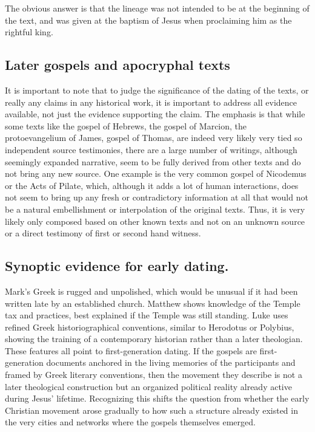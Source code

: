 The obvious answer is that the lineage was not intended to be at the beginning of the text, and was given at the baptism of Jesus when proclaiming him as the rightful king.

\subsection{Later gospels and apocryphal texts}\label{subsec:later-gospels-and-apocryphal-texts}

It is important to note that to judge the significance of the dating of the texts, or really any claims in any historical work, it is important to address all evidence available, not just the evidence supporting the claim.
The emphasis is that while some texts like the gospel of Hebrews, the gospel of Marcion, the protoevangelium of James, gospel of Thomas, are indeed very likely very tied so independent source testimonies, there are a large number of writings, although seemingly expanded narrative, seem to be fully derived from other texts and do not bring any new source.
One example is the very common gospel of Nicodemus or the Acts of Pilate, which, although it adds a lot of human interactions, does not seem to bring up any fresh or contradictory information at all that would not be a natural embellishment or interpolation of the original texts.
Thus, it is very likely only composed based on other known texts and not on an unknown source or a direct testimony of first or second hand witness.

\subsection{Synoptic evidence for early dating.}\label{subsec:synoptic-evidence-for-early-dating.}

Mark's Greek is rugged and unpolished, which would be unusual if it had been written late by an established church.
Matthew shows knowledge of the Temple tax and practices, best explained if the Temple was still standing.
Luke uses refined Greek historiographical conventions, similar to Herodotus or Polybius, showing the training of a contemporary historian rather than a later theologian.
These features all point to first-generation dating.
If the gospels are first-generation documents anchored in the living memories of the participants and framed by Greek literary conventions, then the movement they describe is not a later theological construction but an organized political reality already active during Jesus' lifetime.
Recognizing this shifts the question from whether the early Christian movement arose gradually to how such a structure already existed in the very cities and networks where the gospels themselves emerged.
